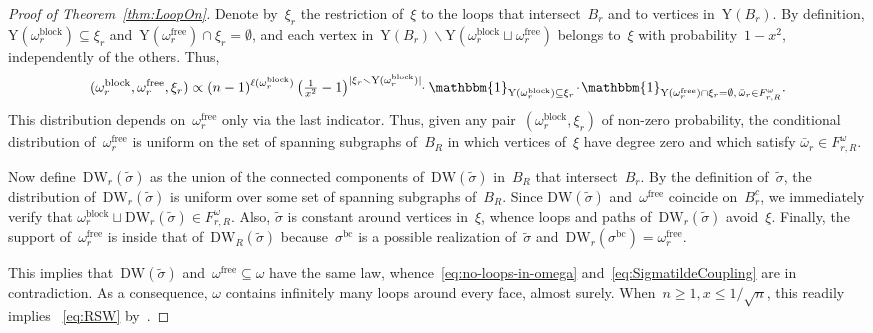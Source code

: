 \documentclass[11pt,letterpaper]{amsart}
\newcounter{n}
\numberwithin{n}{section}
\theoremstyle{plain}
\theoremstyle{definition}
\theoremstyle{remark}
\renewcommand\setminus\smallsetminus
\newcommand\upvert{\mathrm{Y}} %
\newcommand{\1}{\mathbbm{1}}
\newcommand\ballloop{B}
\renewcommand\subset\subseteq
\begin{document}
\begin{proof}[Proof of Theorem~\ref{thm:LoopOn}]
	Denote by~$\xi_r$ the restriction of~$\xi$ to the loops that intersect~$\ballloop_r$ and to vertices in~$\upvert(\ballloop_r)$.
	By definition, $\upvert(\omega^{\mathrm{block}}_r)\subseteq \xi_r$ and~$\upvert(\omega^{\mathrm{free}}_r)\cap \xi_r = \emptyset$, and each vertex in~$\upvert(\ballloop_r)\setminus \upvert(\omega^{\mathrm{block}}_r\sqcup\omega^{\mathrm{free}}_r)$ belongs to~$\xi$ with probability~$1-x^2$, independently of the others.
	Thus,
	\begin{align*}
		(\omega^{\mathrm{block}}_r,\omega^{\mathrm{free}}_r,\xi_r)
		\propto
		(n-1)^{\ell(\omega^{\mathrm{block}}_r)} 
		\left(\tfrac{1}{x^2}-1\right)^{|\xi_r\setminus \upvert(\omega^{\mathrm{block}}_r)|}
		\hspace{-1mm}
		\cdot 
		\1_{\upvert(\omega^{\mathrm{block}}_r)\subseteq \xi_r}
		\hspace{-0.5mm}
		\cdot 
		\hspace{-0.5mm}
		\1_{\upvert(\omega^{\mathrm{free}}_r)\cap \xi_r = \emptyset, \, \bar{\omega}_r \in F_{r,R}^{\omega} }.
	\end{align*}
	This distribution depends on~$\omega^{\mathrm{free}}_r$ only via the last indicator.
	Thus, given any pair~$(\omega^{\mathrm{block}}_r,\xi_r)$ of non-zero probability, the conditional distribution of~$\omega^{\mathrm{free}}_r$ is uniform on the set of spanning subgraphs of~$\ballloop_R$ in which vertices of~$\xi$ have degree zero and which satisfy $\bar{\omega}_r \in F_{r,R}^{\omega}$.
	
	Now define~$\mathrm{DW}_r(\tilde{\sigma})$ as the union of the connected components of~$\mathrm{DW}(\tilde{\sigma})$ in~$\ballloop_R$ that intersect~$\ballloop_r$.
	By the definition of~$\tilde{\sigma}$, the distribution of~$\mathrm{DW}_r(\tilde{\sigma})$ is uniform over some set of spanning subgraphs of~$\ballloop_R$.
	Since $\mathrm{DW}(\tilde{\sigma})$ and~$\omega^{\mathrm{free}}$ coincide on~$\ballloop_r^c$, we immediately verify that $\omega^{\mathrm{block}}_r \sqcup \mathrm{DW}_r(\tilde{\sigma}) \in F_{r,R}^{\omega}$.
	Also, $\tilde{\sigma}$ is constant around vertices in~$\xi$, whence loops and paths of~$\mathrm{DW}_r(\tilde{\sigma})$ avoid~$\xi$.
	Finally, the support of~$\omega^{\mathrm{free}}_r$ is inside that of~$\mathrm{DW}_R(\tilde{\sigma})$ because~$\sigma^\mathrm{bc}$ is a possible realization of~$\tilde{\sigma}$ and~$\mathrm{DW}_r(\sigma^\mathrm{bc}) = \omega^{\mathrm{free}}_r$.
	
	This implies that~$\mathrm{DW}(\tilde{\sigma})$ and~$\omega^{\mathrm{free}}\subset\omega$ have the same law, whence~\eqref{eq:no-loops-in-omega} and~\eqref{eq:SigmatildeCoupling} are in contradiction.
	As a consequence, $\omega$ contains infinitely many loops around every face, almost surely.
	When~$n\geq 1, x\leq 1/\sqrt{n}$, this readily implies ~\eqref{eq:RSW} by~\cite[Theorem~$2$]{DumGlaPel21}.
\end{proof}




\end{document}
